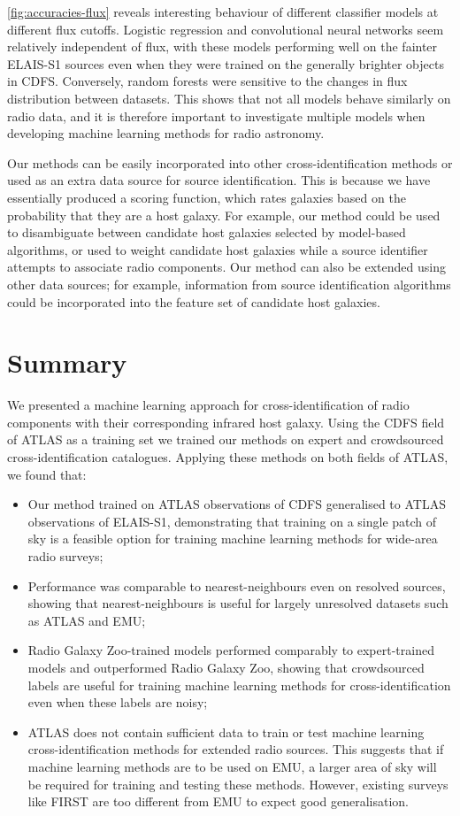 \documentclass[fleqn,usenatbib,usedcolumn]{mnras}
\begin{document}
  \autoref{fig:accuracies-flux} reveals interesting behaviour of different
  classifier models at different flux cutoffs. Logistic regression and
  convolutional neural networks seem relatively independent of flux, with
  these models performing well on the fainter ELAIS-S1 sources even when
  they were trained on the generally brighter objects in CDFS. Conversely,
  random forests were sensitive to the changes in flux distribution between
  datasets. This shows that not all models behave similarly on radio data,
  and it is therefore important to investigate multiple models when
  developing machine learning methods for radio astronomy.

  Our methods can be easily incorporated into other cross-identification
  methods or used as an extra data source for source identification. This is
  because we have essentially produced a scoring function, which rates
  galaxies based on the probability that they are a host galaxy. For
  example, our method could be used to disambiguate between candidate host
  galaxies selected by model-based algorithms, or used to weight candidate
  host galaxies while a source identifier attempts to associate radio
  components. Our method can also be extended using other data sources; for
  example, information from source identification algorithms could be
  incorporated into the feature set of candidate host galaxies.

\section{Summary}

  We presented a machine learning approach for cross-identification of radio
  components with their corresponding infrared host galaxy. Using the CDFS field of ATLAS as a training set we trained our
  methods on expert and crowdsourced cross-identification catalogues. Applying these methods on both fields of ATLAS, we found that:
  \begin{itemize}
    \item Our method trained on ATLAS observations of CDFS generalised to ATLAS observations of ELAIS-S1, demonstrating that training on a single patch of sky is a feasible option for training machine learning methods for wide-area radio surveys;
    \item Performance was comparable to nearest-neighbours even on resolved sources, showing that nearest-neighbours is useful for largely unresolved datasets such as ATLAS and EMU;
    \item Radio Galaxy Zoo-trained models performed comparably to expert-trained models and outperformed Radio Galaxy Zoo, showing that crowdsourced labels are useful for training machine learning methods for cross-identification even when these labels are noisy;
    \item ATLAS does not contain sufficient data to train or test machine learning cross-identification methods for extended radio sources. This suggests that if machine learning methods are to be used on EMU, a larger area of sky will be required for training and testing these methods. However, existing surveys like FIRST are too different from EMU to expect good generalisation.
  \end{itemize}
\end{document}
